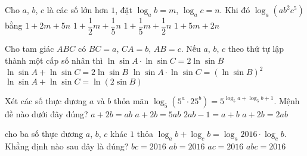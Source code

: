 \begin{ex}
	Cho $a$, $b$, $c$ là các số lớn hơn $1$, đặt $\log_ab=m$, $\log_ac=n$. Khi đó $\log_a\left(ab^2c^5\right)$ bằng
	\choice
	{\True $1+2m+5n$}
	{$1+\dfrac{1}{2}m+\dfrac{1}{5}n$}
	{$1+\dfrac{1}{5}m+\dfrac{1}{2}n$}
	{$1+5m+2n$}
\end{ex}
\begin{ex}
	Cho tam giác $ABC$ có $BC=a$, $CA=b$, $AB=c$. Nếu $a$, $b$, $c$ theo thứ tự lập thành một cấp số nhân thì
	\choice
	{$\ln \sin A\cdot\ln \sin C=2\ln \sin B$}
	{\True $\ln \sin A+\ln \sin C=2\ln \sin B$}
	{$\ln \sin A\cdot\ln \sin C=(\ln \sin B)^2$}
	{$\ln \sin A+\ln \sin C=\ln (2\sin B)$}
\end{ex}
\begin{ex}
	Xét các số thực dương $a$ và $b$ thỏa mãn $\log_5\left(5^a\cdot 25^b\right)=5^{\log_5a+\log_5b+1}$. Mệnh đề nào dưới đây đúng?
	\choice
	{$a+2b=ab$}
	{\True $a+2b=5ab$}
	{$2ab-1=a+b$}
	{$a+2b=2ab$}
\end{ex}
\begin{ex}
	cho ba số thực dương $a$, $b$, $c$ khác $1$ thỏa $\log_a b + \log_c b = \log_a 2016 \cdot \log_c b$. Khẳng định nào sau đây là đúng?	
	\choice
	{$bc=2016$}
	{$ab=2016$}
	{\True $ac=2016$}
	{$abc=2016$}
\end{ex}
